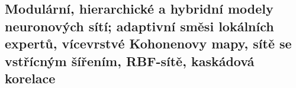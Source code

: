 \subsection{Modulární, hierarchické a hybridní modely neuronových sítí; adaptivní směsi lokálních expertů, vícevrstvé Kohonenovy mapy, sítě se vstřícným šířením, RBF-sítě, kaskádová korelace}